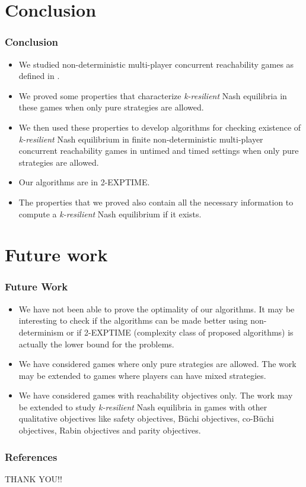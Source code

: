 \documentclass{beamer}
\newcommand\Fontci{\fontsize{4}{4}\selectfont}
\newcommand\Fontti{\fontsize{25}{15}\selectfont}
\begin{document}
\section[Conclusion]{Conclusion}
\begin{frame}
 \frametitle{Conclusion}
 \begin{itemize}
	\item We studied non-deterministic multi-player concurrent reachability games as defined in \cite{BBM-concur10,BBM-report}.
 	\item We proved some properties that characterize \textit{k-resilient} Nash equilibria in these games when only pure strategies are allowed.
 	\item We then used these properties to develop algorithms for checking existence of \textit{k-resilient} Nash equilibrium in finite non-deterministic multi-player concurrent reachability games in untimed and timed settings when only pure strategies are allowed.
 	\item Our algorithms are in 2-EXPTIME.
 	\item The properties that we proved also contain all the necessary information to compute a \textit{k-resilient} Nash equilibrium if it exists.
  \end{itemize}
\end{frame}

\section[Future Work]{Future work}
\begin{frame}
 \frametitle{Future Work}
\begin{itemize}
	\item We have not been able to prove the optimality of our algorithms. It may be interesting to check if the algorithms can be made better using non-determinism or if 2-EXPTIME (complexity class of proposed algorithms) is actually the lower bound for the problems.
	\item We have considered games where only pure strategies are allowed. The work may be extended to games where players can have mixed strategies.
	\item We have considered games with reachability objectives only. The work may be extended to study \textit{k-resilient} Nash equilibria in games with other qualitative objectives like safety objectives, B{\"u}chi objectives, co-B{\"u}chi objectives, Rabin objectives and parity objectives.
\end{itemize}
\end{frame}

\begin{frame}[allowframebreaks]
  \frametitle{References}
  
  \Fontci
  
\end{frame}

\begin{frame}
 \begin{center}
  \Fontti
  THANK YOU!!
 \end{center}
\end{frame}
\end{document}
